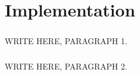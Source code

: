\chapter{Implementation}
\paragraph{}WRITE HERE, PARAGRAPH 1.
\paragraph{}WRITE HERE, PARAGRAPH 2.

\newpage

